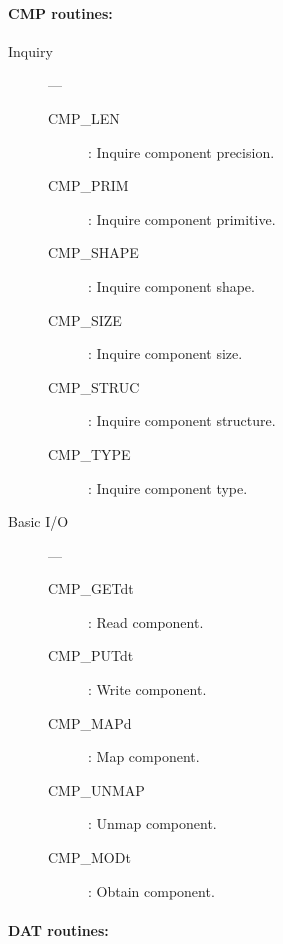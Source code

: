 \paragraph{CMP routines:}

\begin{description}

\item [Inquiry] ---

\begin{description}
\item [CMP\_LEN] : Inquire component precision.
\item [CMP\_PRIM] : Inquire component primitive.
\item [CMP\_SHAPE] : Inquire component shape.
\item [CMP\_SIZE] : Inquire component size.
\item [CMP\_STRUC] : Inquire component structure.
\item [CMP\_TYPE] : Inquire component type.
\end{description}

\item [Basic I/O] ---

\begin{description}
\item [CMP\_GETdt] : Read component.
\item [CMP\_PUTdt] : Write component.
\item [CMP\_MAPd] : Map component.
\item [CMP\_UNMAP] : Unmap component.
\item [CMP\_MODt] : Obtain component.
\end{description}

\end{description}

\newpage

\paragraph{DAT routines:}

